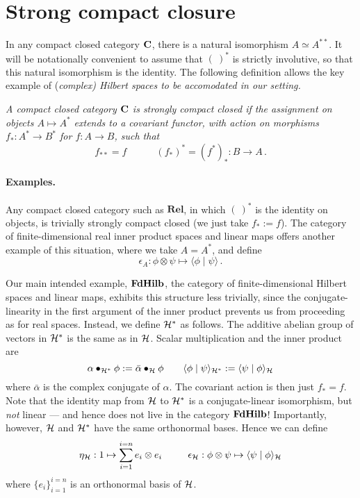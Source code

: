 \documentclass[10pt]{article}
\begin{document}
\section{Strong compact closure}
In any compact closed category
$\mathbf{C}$, there is a natural isomorphism $A \simeq A^{**}$. It will be
notationally convenient to assume that $(\ )^*$ is strictly
involutive, so that this natural isomorphism is the identity. The
following definition allows the key example of (\em complex\em)
Hilbert spaces to be  accomodated in our
setting.

\begin{definition}\em
A compact closed category $\mathbf{C}$ is \emph{strongly compact closed}
if the assignment on objects ${A \mapsto A^*}$ extends to a 
\emph{covariant} functor, with action on morphisms $f_* : A^* \to
B^*$ for $f : A \to B$, such that
\[ f_{**} = f \qquad \quad
(f_* )^* = (f^* )_* : B \to A\,. 
\]
\end{definition}

\paragraph{Examples.} Any compact closed category such as
$\mathbf{Rel}$, in which $(\ )^*$ is
the identity on objects, is trivially strongly compact closed (we just 
take $f_* \!:= f$). The
category of finite-dimensional  real inner product spaces and linear
maps offers another example of this situation, where we take $A =
A^*$, and define
\[ 
\epsilon_A : \phi \otimes \psi \mapsto \langle \phi \mid \psi
\rangle\, . 
\]

Our main intended example, $\mathbf{FdHilb}$, the category of
finite-dimensional Hilbert spaces and linear maps, exhibits this
structure less trivially, since the conjugate-linearity in the first
argument of the inner product prevents us from proceeding as for real 
spaces. Instead, we define $\mathcal{H}^*$ as follows.
The additive abelian group of
vectors   in $\mathcal{H}^*$ is the same as in $\mathcal{H}$. Scalar
multiplication and the inner product are 
\[ \alpha \bullet_{\mathcal{H}^*} \phi := \bar{\alpha} \bullet_{\mathcal{H}} \phi \qquad 
\langle \phi \mid \psi \rangle_{\mathcal{H}^*} := \langle \psi \mid \phi
\rangle_{\mathcal{H}} \]
where $\bar{\alpha}$ is the complex conjugate of $\alpha$.
The  covariant action is then just $f_* = f$. 
Note that the identity map from $\mathcal{H}$ to $\mathcal{H}^*$ is a conjugate-linear 
isomorphism, but \emph{not} linear --- and hence does not live in the
category $\mathbf{FdHilb}$! Importantly, however, $\mathcal{H}$ and $\mathcal{H}^*$ have the
same orthonormal bases. Hence we can define
\[ 
\eta_{\mathcal{H}} : 1 \mapsto \sum_{i=1}^{i=n} e_i \otimes e_i 
\qquad  \ \
\epsilon_{\mathcal{H}} : \phi \otimes \psi\mapsto \langle \psi \mid \phi\rangle_{\mathcal{H}}
\]
where $\{ e_i \}_{i=1}^{i=n}$ is an orthonormal basis of $\mathcal{H}$.
\end{document}
